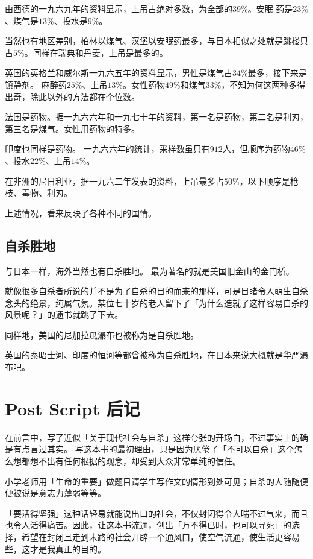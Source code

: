 \documentclass[UTF8]{ctexart}
\begin{document}
由西德的一九六九年的资料显示，上吊占绝对多数，为全部的$39\%$。安眠 药是$23\%$、煤气是$13\%$、投水是$9\%$。

当然也有地区差别，柏林以煤气、汉堡以安眠药最多，与日本相似之处就是跳楼只占$5\%$。同样在瑞典和丹麦，上吊是最多的。

英国的英格兰和威尔斯一九六五年的资料显示，男性是煤气占$34\%$最多，接下来是镇静剂。 
麻醉药$25\%$、上吊$13\%$。女性药物$49\%$和煤气$33\%$，不知为何这两种多得出奇，除此以外的方法都在个位数。

法国是药物。据一九六六年和一九七十年的资料，第一名是药物，第二名是利刃，第三名是煤气。女性用药物的特多。

印度也同样是药物。
一九六六年的统计，采样数虽只有$912$人，但顺序为药物$46\%$、投水$22\%$、上吊$14\%$。

在非洲的尼日利亚，据一九六二年发表的资料，上吊最多占$50\%$，以下顺序是枪枝、毒物、利刃。

上述情况，看来反映了各种不同的国情。

\subsection{自杀胜地}

与日本一样，海外当然也有自杀胜地。
最为著名的就是美国旧金山的金门桥。

就像很多自杀者所说的并不是为了自杀的目的而来的那样，可是目睹令人萌生自杀念头的绝景，纯属气氛。某位七十岁的老人留下了「为什么造就了这样容易自杀的风景呢？」的遗书就跳了下去。

同样地，美国的尼加拉瓜瀑布也被称为是自杀胜地。

英国的泰晤士河、印度的恒河等都曾被称为自杀胜地，在日本来说大概就是华严瀑布吧。

\newpage

\section{Post Script 后记}

在前言中，写了近似「关于现代社会与自杀」这样夸张的开场白，不过事实上的确是有点言过其实。
写这本书的最初理由，只是因为厌倦了「不可以自杀」这个怎么想都想不出有任何根据的观念，却受到大众非常单纯的信任。

小学老师用「生命的重要」做题目请学生写作文的情形到处可见；自杀的人随随便便被说是意志力薄弱等等。

「要活得坚强」这种话轻易就能说出口的社会，不仅封闭得令人喘不过气来，而且也令人活得痛苦。因此，让这本书流通，创出「万不得已时，也可以寻死」的选择，希望在封闭且走到末路的社会开辟一个通风口，使空气流通，使生活更容易些，这才是我真正的目的。
\end{document}
